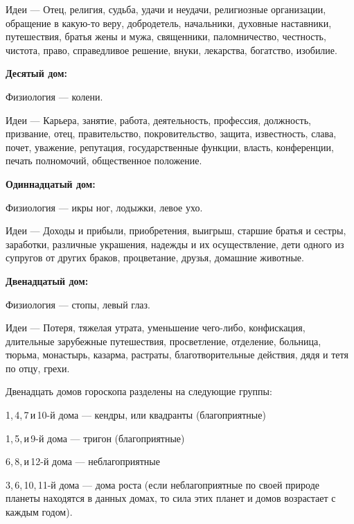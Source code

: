 \begin{myenum}
\begin{mydescr}
			\item[Идеи] --- Отец, религия, судьба, удачи и неудачи, религиозные организации, обращение в какую-то веру, добродетель, начальники, духовные наставники, путешествия, братья жены и мужа, священники, паломничество, честность, чистота, право, справедливое решение, внуки, лекарства, богатство, изобилие.
		\end{mydescr}
	\item \textbf{Десятый дом:}
		\begin{mydescr}
			\item[Физиология] --- колени.
			\item[Идеи] --- Карьера, занятие, работа, деятельность, профессия, должность, призвание, отец, правительство, покровительство, защита, известность, слава, почет, уважение, репутация, государственные функции, власть, конференции, печать полномочий, общественное положение.
		\end{mydescr}
	\item \textbf{Одиннадцатый дом:}
		\begin{mydescr}
			\item[Физиология] --- икры ног, лодыжки, левое ухо.
			\item[Идеи] --- Доходы и прибыли, приобретения, выигрыш, старшие братья и сестры, заработки, различные украшения, надежды и их осуществление, дети одного из супругов от других браков, процветание, друзья, домашние животные.
		\end{mydescr}
	\item \textbf{Двенадцатый дом:}
		\begin{mydescr}
			\item[Физиология] --- стопы, левый глаз.
			\item[Идеи] --- Потеря, тяжелая утрата, уменьшение чего-либо, конфискация, длительные зарубежные путешествия, просветление, отделение, больница, тюрьма, монастырь, казарма, растраты, благотворительные действия, дядя и тетя по отцу, грехи.
		\end{mydescr}
\end{myenum}

Двенадцать домов гороскопа разделены на следующие группы:
\begin{myitem}
	\item 1,\,4,\,7\,и\,10-й дома --- кендры, или квадранты (благоприятные)
	\item 1,\,5,\,и\,9-й дома --- тригон (благоприятные)
	\item 6,\,8,\,и\,12-й дома --- неблагоприятные
	\item 3,\,6,\,10,\и\,11-й дома --- дома роста (если неблагоприятные по своей природе планеты находятся в данных домах, то сила этих планет и домов возрастает с каждым годом).
\end{myitem}

